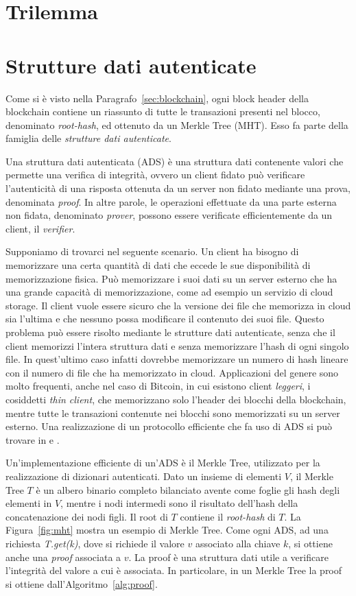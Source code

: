 \section{Trilemma}

\section{Strutture dati autenticate}

Come si è visto nella Paragrafo~\ref{sec:blockchain}, ogni block header della blockchain contiene un riassunto di tutte le transazioni presenti nel blocco, denominato \emph{root-hash}, ed ottenuto da un Merkle Tree (MHT). Esso fa parte della famiglia delle \emph{strutture dati autenticate}.

Una struttura dati autenticata (ADS) è una struttura dati contenente valori che permette una verifica di integrità, ovvero un client fidato può verificare l'autenticità di una risposta ottenuta da un server non fidato mediante una prova, denominata \emph{proof}. In altre parole, le operazioni effettuate da una parte esterna non fidata, denominato \emph{prover}, possono essere verificate efficientemente da un client, il \emph{verifier}.

Supponiamo di trovarci nel seguente scenario. Un client ha bisogno di memorizzare una certa quantità di dati che eccede le sue disponibilità di memorizzazione fisica. Può memorizzare i suoi dati su un server esterno che ha una grande capacità di memorizzazione, come ad esempio un servizio di cloud storage. Il client vuole essere sicuro che la versione dei file che memorizza in cloud sia l'ultima e che nessuno possa modificare il contenuto dei suoi file. Questo problema può essere risolto mediante le strutture dati autenticate, senza che il client memorizzi l'intera struttura dati e senza memorizzare l'hash di ogni singolo file. In quest'ultimo caso infatti dovrebbe memorizzare un numero di hash lineare con il numero di file che ha memorizzato in cloud. Applicazioni del genere sono molto frequenti, anche nel caso di Bitcoin, in cui esistono client \emph{leggeri}, i cosiddetti \emph{thin client}, che memorizzano solo l'header dei blocchi della blockchain, mentre tutte le transazioni contenute nei blocchi sono memorizzati su un server esterno. Una realizzazione di un protocollo efficiente che fa uso di ADS si può trovare in \cite{pennino2019pipeline} e \cite{gdm}.

Un'implementazione efficiente di un'ADS è il Merkle Tree, utilizzato per la realizzazione di dizionari autenticati. Dato un insieme di elementi $V$, il Merkle Tree $T$ è un albero binario completo bilanciato avente come foglie gli hash degli elementi in $V$, mentre i nodi intermedi sono il risultato dell'hash della concatenazione dei nodi figli. Il root di $T$ contiene il \emph{root-hash} di $T$. La Figura~\ref{fig:mht} mostra un esempio di Merkle Tree.
Come ogni ADS, ad una richiesta \emph{T.get(k)}, dove si richiede il valore $v$ associato alla chiave $k$, si ottiene anche una \emph{proof} associata a $v$. La proof è una struttura dati utile a verificare l'integrità del valore a cui è associata. In particolare, in un Merkle Tree la proof si ottiene dall'Algoritmo~\ref{alg:proof}.

